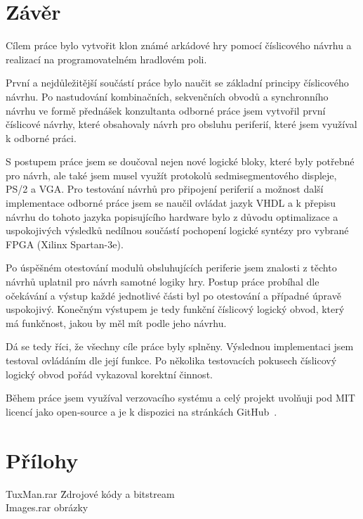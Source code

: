 \documentclass{report}
\begin{document}
 \chapter*{Závěr}


Cílem práce bylo vytvořit klon známé arkádové hry pomocí číslicového návrhu a realizací na programovatelném hradlovém poli.\par
První a nejdůležitější součástí práce bylo naučit se základní principy číslicového návrhu. Po nastudování kombinačních, sekvenčních obvodů a synchronního návrhu ve formě přednášek konzultanta odborné práce jsem vytvořil první číslicové návrhy, které obsahovaly návrh pro obsluhu periferií, které jsem využíval k odborné práci. \par
S postupem práce jsem se doučoval nejen nové logické bloky, které byly potřebné pro návrh, ale také jsem musel využít protokolů sedmisegmentového displeje, PS/2 a VGA. Pro testování návrhů pro připojení periferií a možnost další implementace odborné práce jsem se naučil ovládat jazyk VHDL a k přepisu návrhu do tohoto jazyka popisujícího hardware bylo z důvodu optimalizace a uspokojivých výsledků nedílnou součástí pochopení logické syntézy pro vybrané FPGA (Xilinx Spartan-3e). \par
Po úspěšném otestování modulů obsluhujících periferie jsem znalosti z těchto návrhů uplatnil pro návrh samotné logiky hry. Postup práce probíhal dle očekávání a výstup každé jednotlivé části byl po otestování a případné úpravě uspokojivý. Konečným výstupem je tedy funkční číslicový logický obvod, který má funkčnost, jakou by měl mít podle jeho návrhu.\par
Dá se tedy říci, že všechny cíle práce byly splněny. Výslednou implementaci jsem testoval ovládáním dle její funkce. Po několika testovacích pokusech číslicový logický obvod pořád vykazoval korektní činnost. \par
Během práce jsem využíval verzovacího systému a celý projekt uvolňuji pod MIT licencí jako open-source a je k dispozici na stránkách GitHub~\cite{githubrepo}.




\chapter*{Přílohy}
\begin{tabbing}
    TuxMan.rar \hspace{5em} \= Zdrojové kódy a bitstream  \\
    Images.rar \>  obrázky \\
\end{tabbing}
\end{document}
